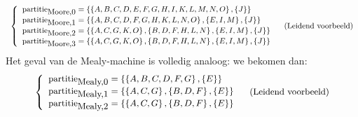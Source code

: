 \begin{equation}
\small{
\begin{array}{lr}
\left\{\begin{array}{l}
\mbox{partitie}_{\mbox{\small{Moore,0}}}=\left\{\left\{A,B,C,D,E,F,G,H,I,K,L,M,N,O\right\},\left\{J\right\}\right\}\\
\mbox{partitie}_{\mbox{\small{Moore,1}}}=\left\{\left\{A,B,C,D,F,G,H,K,L,N,O\right\},\left\{E,I,M\right\},\left\{J\right\}\right\}\\
\mbox{partitie}_{\mbox{\small{Moore,2}}}=\left\{\left\{A,C,G,K,O\right\},\left\{B,D,F,H,L,N\right\},\left\{E,I,M\right\},\left\{J\right\}\right\}\\
\mbox{partitie}_{\mbox{\small{Moore,3}}}=\left\{\left\{A,C,G,K,O\right\},\left\{B,D,F,H,L,N\right\},\left\{E,I,M\right\},\left\{J\right\}\right\}
\end{array}\right.&\mbox{(Leidend voorbeeld)}
\end{array}}
\end{equation}
Het geval van de Mealy-machine is volledig analoog: we bekomen dan:
\begin{equation}
\small{
\begin{array}{lr}
\left\{\begin{array}{l}
\mbox{partitie}_{\mbox{\small{Mealy,0}}}=\left\{\left\{A,B,C,D,F,G\right\},\left\{E\right\}\right\}\\
\mbox{partitie}_{\mbox{\small{Mealy,1}}}=\left\{\left\{A,C,G\right\},\left\{B,D,F\right\},\left\{E\right\}\right\}\\
\mbox{partitie}_{\mbox{\small{Mealy,2}}}=\left\{\left\{A,C,G\right\},\left\{B,D,F\right\},\left\{E\right\}\right\}
\end{array}\right.&\mbox{(Leidend voorbeeld)}
\end{array}}
\end{equation}
